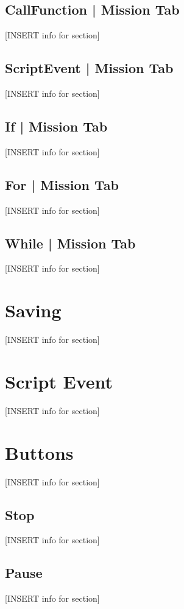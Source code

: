         \subsection{CallFunction | Mission Tab}
        [INSERT info for section]

        \subsection{ScriptEvent | Mission Tab}
        [INSERT info for section]

        \subsection{If | Mission Tab}
        [INSERT info for section]

        \subsection{For | Mission Tab}
        [INSERT info for section]

        \subsection{While | Mission Tab}
        [INSERT info for section]

    \section{Saving}
    [INSERT info for section]

    \section{Script Event}
    [INSERT info for section]

    \section{Buttons}
    [INSERT info for section]

        \subsection{Stop}
        [INSERT info for section]

        \subsection{Pause}
        [INSERT info for section]

